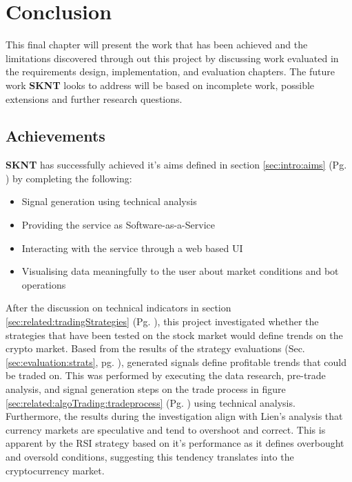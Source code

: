 %
\chapter{Conclusion}
\label{sec:conclusion}
 \noindent This final chapter will present the work that has been achieved and the limitations discovered through out this project by discussing work evaluated in the requirements design, implementation, and evaluation chapters. The future work \textbf{SKNT} looks to address will be based on incomplete work, possible extensions and further research questions.

\section{Achievements}
\label{sec:conclusion:achievements}
\noindent \textbf{SKNT} has successfully achieved it's aims defined in section \ref{sec:intro:aims} (Pg. \pageref{sec:intro:aims}) by completing the following:

\begin{itemize}
    \item Signal generation using technical analysis
    \item Providing the service as Software-as-a-Service
    \item Interacting with the service through a web based UI
    \item Visualising data meaningfully to the user about market conditions and bot operations
\end{itemize}

\noindent After the discussion on technical indicators in section \ref{sec:related:tradingStrategies} (Pg. \pageref{sec:related:tradingStrategies}), this project investigated whether the strategies that have been tested on the stock market would define trends on the crypto market. Based from the results of the strategy evaluations (Sec. \ref{sec:evaluation:strats}, pg. \pageref{sec:evaluation:strats}), generated signals define profitable trends that could be traded on. This was performed by executing the data research, pre-trade analysis, and signal generation steps on the trade process in figure \ref{sec:related:algoTrading:tradeprocess} (Pg. \pageref{sec:related:algoTrading:tradeprocess}) using technical analysis. Furthermore, the results during the investigation align with Lien's \cite{BOOK:Lien:2016} analysis that currency markets are speculative and tend to overshoot and correct. This is apparent by the RSI strategy based on it's performance as it defines overbought and oversold conditions, suggesting this tendency translates into the cryptocurrency market.

